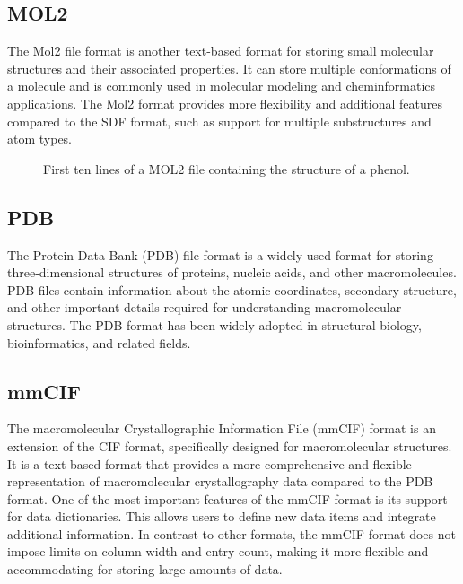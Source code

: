 \documentclass[
  digital,     %
  oneside,     %
  nosansbold,  %
  nocolorbold, %
  lof,         %
  lot,         %
]{fithesis4}
\begin{document}
\subsection{MOL2}
\label{subsection:mol2}

The Mol2 file format is another text-based format for storing small molecular structures and their associated properties. It can store multiple conformations of a molecule and is commonly used in molecular modeling and cheminformatics applications. The Mol2 format provides more flexibility and additional features compared to the SDF format, such as support for multiple substructures and atom types.

\begin{figure}[htbp]
  \centering
  \lstset{
    basicstyle=\ttfamily,
    breaklines=true,
    columns=fullflexible
    }
    
    \caption{First ten lines of a MOL2 file containing the structure of a phenol.}
    \label{fig:mol2}
  \end{figure}


\subsection{PDB}
\label{subsection:pdb}

\cite{gu2009structural}

The Protein Data Bank (PDB) file format is a widely used format for storing three-dimensional structures of proteins, nucleic acids, and other macromolecules. PDB files contain information about the atomic coordinates, secondary structure, and other important details required for understanding macromolecular structures. The PDB format has been widely adopted in structural biology, bioinformatics, and related fields.

\subsection{mmCIF}
\label{subsection:mmcif}


\cite{gu2009structural}

The macromolecular Crystallographic Information File (mmCIF) format is an extension of the CIF format, specifically designed for macromolecular structures.
It is a text-based format that provides a more comprehensive and flexible representation of macromolecular crystallography data compared to the PDB format.
One of the most important features of the mmCIF format is its support for data dictionaries.
This allows users to define new data items and integrate additional information.
In contrast to other formats, the mmCIF format does not impose limits on column width and entry count, making it more flexible and accommodating for storing large amounts of data.
\end{document}
